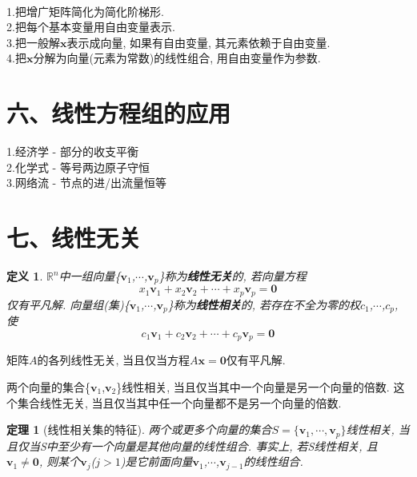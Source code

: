 \documentclass[UTF8,fontset=ubuntu]{ctexart}
\theoremstyle{plain}
\newtheorem{theorem}{定理}
\theoremstyle{nonumberplain}
\newtheorem{definition}{定义}
\theoremstyle{empty}
\begin{document}
\begin{law}\ \\
1.把增广矩阵简化为简化阶梯形.\\
2.把每个基本变量用自由变量表示.\\
3.把一般解$\bm{x}$表示成向量, 如果有自由变量, 其元素依赖于自由变量.\\
4.把$\bm{x}$分解为向量(元素为常数)的线性组合, 用自由变量作为参数.
\end{law}\vspace{4ex}

\section{六、线性方程组的应用}
1.经济学 - 部分的收支平衡\\
2.化学式 - 等号两边原子守恒\\
3.网络流 - 节点的进/出流量恒等\\[4ex]

\section{七、线性无关}
\begin{definition}
$\mathbb{R}^n$中一组向量\{$\bm{v}_1$,$\cdots$,$\bm{v}_p$\}称为\textbf{线性无关}的, 若向量方程
\[x_1\bm{v}_1+x_2\bm{v}_2+\cdots+x_p\bm{v}_p=\bm{0}\]
仅有平凡解. 向量组(集)\{$\bm{v}_1$,$\cdots$,$\bm{v}_p$\}称为\textbf{线性相关}的, 若存在不全为零的权$c_1$,$\cdots$,$c_p$, 使
\[c_1\bm{v}_1+c_2\bm{v}_2+\cdots+c_p\bm{v}_p=\bm{0}\]
\end{definition}\vspace{2ex}

\begin{law}
矩阵$A$的各列线性无关, 当且仅当方程$A\bm{x}=\bm{0}$仅有平凡解.
\end{law}\vspace{2ex}

\begin{law}
两个向量的集合\{$\bm{v}_1$,$\bm{v}_2$\}线性相关, 当且仅当其中一个向量是另一个向量的倍数. 这个集合线性无关, 当且仅当其中任一个向量都不是另一个向量的倍数.
\end{law}\vspace{4ex}

\begin{theorem}[线性相关集的特征]
两个或更多个向量的集合$S=\{\bm{v}_1,\cdots,\bm{v}_p\}$线性相关, 当且仅当S中至少有一个向量是其他向量的线性组合. 事实上, 若S线性相关, 且$\bm{v}_1\neq\bm{0}$, 则某个$\bm{v}_j$($j>1$)是它前面向量$\bm{v}_1$,$\cdots$,$\bm{v}_{j-1}$的线性组合.
\end{theorem}\vspace{4ex}
\end{document}
